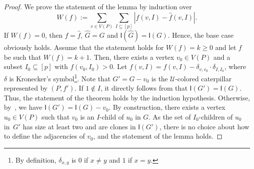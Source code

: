 \documentclass{lmcs}
\theoremstyle{definition}
\begin{document}
\begin{proof}
	We prove the statement of the lemma by induction over 
	\[W(f):=\sum_{v\in V(P)}\sum_{I\subseteq [p]} |f(v,I)-\widehat f(v,I)|.\]
	If $W(f)=0$, then $f=\widehat f$, $\widehat{G}=G$ and $\mathsf{I}(\widehat{G})=\mathsf I(G)$. Hence, the base case obviously holds.
	Assume that the statement holds for $W(f)=k\geq 0$ and 
	let $f$ be such that $W(f)=k+1$. Then, there exists a vertex $v_0\in V(P)$ and a subset $I_0\subseteq [p]$ with 
	$f(v_0,I_0)>0$.  Let $f(v,I)=f(v,I)-\delta_{v,v_0}\cdot\delta_{I,I_0}$, where $\delta$ is Kronecker's symbol\footnote{By definition, $\delta_{x,y}$ is $0$ if $x\neq y$ and $1$ if $x=y$.}.
	Note that $G'=G-v_0$ is the $\mathcal U$-colored caterpillar represented by $(P,f')$.
	If $1\notin I$, it directly follows from  that
	$\mathsf I(G')=\mathsf I(G)$. Thus, the statement of the theorem holds by the induction hypothesis.
	Otherwise, by~, we have $\mathsf I(G')=\mathsf I(G)-v_0$. By construction, there exists a vertex $u_0\in V(P)$ such that $v_0$ is an $I$-child of $u_0$ in $G$.  As the set of $I_0$-children of $u_0$ in~$G'$ has size at least two and are clones in $\mathsf I(G')$, there is no choice about how to define the adjacencies of $v_0$, and the statement of the lemma holds.
\end{proof}
\end{document}

